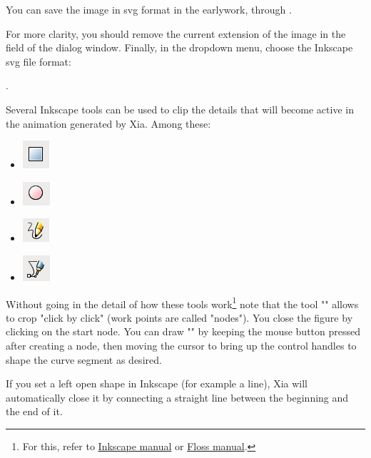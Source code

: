 You can save the image in svg format in the earlywork, 
through  .

For more clarity, you should remove the current extension of the image 
in the field  of the dialog window. Finally, in the 
dropdown menu, choose the Inkscape svg file format:

.

Several Inkscape tools can be used to clip the details that
will become active in the animation generated by Xia. Among these:
\begin{itemize}
 \item \includegraphics[scale=0.5]{./images/rec_carre} 
 \item \includegraphics[scale=0.5]{./images/cercles} 
 \item \includegraphics[scale=0.5]{./images/lignes} 
 \item \includegraphics[scale=0.5]{./images/bezier} 
\end{itemize}

Without going in the detail of how these tools work\footnote{For this, 
refer to \href{http://inkscape.org/doc/shapes/tutorial-shapes.fr.html}{Inkscape manual} or \href{http://en.flossmanuals.net/inkscape/}{Floss manual}.} note that the tool "" 
allows to crop "click by click" (work points are called 
"nodes").  You close the figure by clicking on the start node. 
You can draw "" by keeping the mouse button pressed 
after creating a node, then moving the cursor to bring up the control handles 
to shape the curve segment as desired.


\begin{alerte}
  If you set a left open shape in Inkscape (for example a line), Xia will automatically close it  by connecting a straight line between the beginning and the end of it.
\end{alerte}

